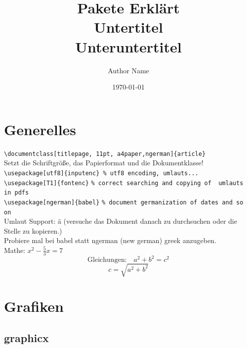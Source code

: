 \documentclass[titlepage, 11pt, a4paper,ngerman]{article}
\begin{document}
\title{
	{\Huge Pakete Erklärt}\\[1em]
	{\huge Untertitel}\\[1em]
	{\Large Unteruntertitel}
	\thispagestyle{empty}}
\author{Author Name}
\date{ \today}
\maketitle

\thispagestyle{empty}
\pagebreak
{}
\tableofcontents \thispagestyle{fancy}
\listoffigures \thispagestyle{fancy}
\listoftables \thispagestyle{fancy}
\pagebreak


\newpage

\section{Generelles}

\verb|\documentclass[titlepage, 11pt, a4paper,ngerman]{article}|\\
Setzt die Schriftgröße, das Papierformat und die Dokumentklasse!\\[10pt]
\verb|\usepackage[utf8]{inputenc} % utf8 encoding, umlauts...|\\
\verb|\usepackage[T1]{fontenc}| \texttt{\% correct searching and copying of \ um\-lauts in pdfs}\\
\verb|\usepackage[ngerman]{babel}| \texttt{\% document germanization of dates and so on}\\[10pt]
Umlaut Support: ä (versuche das Dokument danach zu durchsuchen oder die Stelle zu kopieren.)\\
Probiere mal bei babel statt ngerman (new german) greek anzugeben.\\[10pt]
Mathe: $ x^2 - \frac{5}{3}x = 7 $ \label{test}
\begin{equation}
\textrm{Gleichungen:} \quad a^2 + b^2 = c^2
\label{Pythagoras}
\end{equation}
\begin{equation}
c = \sqrt{a^2 + b^2}
\label{2}
\end{equation}

\section{Grafiken}

\subsection{graphicx}
\end{document}

